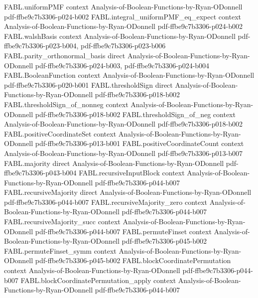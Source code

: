 \begin{theorem}
  {FABL.uniformPMF}
  {context}
  {Analysis-of-Boolean-Functions-by-Ryan-ODonnell}
  {pdf-ffbe9c7b3306-p024-b002}
\proofstep
  {FABL.integral_uniformPMF_eq_expect}
  {context}
  {Analysis-of-Boolean-Functions-by-Ryan-ODonnell}
  {pdf-ffbe9c7b3306-p024-b002}
\proofstep
  {FABL.walshBasis}
  {context}
  {Analysis-of-Boolean-Functions-by-Ryan-ODonnell}
  {pdf-ffbe9c7b3306-p023-b004,
    pdf-ffbe9c7b3306-p023-b006}
\proofstep
  {FABL.parity_orthonormal_basis}
  {direct}
  {Analysis-of-Boolean-Functions-by-Ryan-ODonnell}
  {pdf-ffbe9c7b3306-p024-b003,
    pdf-ffbe9c7b3306-p024-b004}
\proofstep
  {FABL.BooleanFunction}
  {context}
  {Analysis-of-Boolean-Functions-by-Ryan-ODonnell}
  {pdf-ffbe9c7b3306-p020-b001}
\proofstep
  {FABL.thresholdSign}
  {direct}
  {Analysis-of-Boolean-Functions-by-Ryan-ODonnell}
  {pdf-ffbe9c7b3306-p018-b002}
\proofstep
  {FABL.thresholdSign_of_nonneg}
  {context}
  {Analysis-of-Boolean-Functions-by-Ryan-ODonnell}
  {pdf-ffbe9c7b3306-p018-b002}
\proofstep
  {FABL.thresholdSign_of_neg}
  {context}
  {Analysis-of-Boolean-Functions-by-Ryan-ODonnell}
  {pdf-ffbe9c7b3306-p018-b002}
\proofstep
  {FABL.positiveCoordinateSet}
  {context}
  {Analysis-of-Boolean-Functions-by-Ryan-ODonnell}
  {pdf-ffbe9c7b3306-p013-b001}
\proofstep
  {FABL.positiveCoordinateCount}
  {context}
  {Analysis-of-Boolean-Functions-by-Ryan-ODonnell}
  {pdf-ffbe9c7b3306-p013-b007}
\proofstep
  {FABL.majority}
  {direct}
  {Analysis-of-Boolean-Functions-by-Ryan-ODonnell}
  {pdf-ffbe9c7b3306-p043-b004}
\proofstep
  {FABL.recursiveInputBlock}
  {context}
  {Analysis-of-Boolean-Functions-by-Ryan-ODonnell}
  {pdf-ffbe9c7b3306-p044-b007}
\proofstep
  {FABL.recursiveMajority}
  {direct}
  {Analysis-of-Boolean-Functions-by-Ryan-ODonnell}
  {pdf-ffbe9c7b3306-p044-b007}
\proofstep
  {FABL.recursiveMajority_zero}
  {context}
  {Analysis-of-Boolean-Functions-by-Ryan-ODonnell}
  {pdf-ffbe9c7b3306-p044-b007}
\proofstep
  {FABL.recursiveMajority_succ}
  {context}
  {Analysis-of-Boolean-Functions-by-Ryan-ODonnell}
  {pdf-ffbe9c7b3306-p044-b007}
\proofstep
  {FABL.permuteFinset}
  {context}
  {Analysis-of-Boolean-Functions-by-Ryan-ODonnell}
  {pdf-ffbe9c7b3306-p045-b002}
\proofstep
  {FABL.permuteFinset_symm}
  {context}
  {Analysis-of-Boolean-Functions-by-Ryan-ODonnell}
  {pdf-ffbe9c7b3306-p045-b002}
\proofstep
  {FABL.blockCoordinatePermutation}
  {context}
  {Analysis-of-Boolean-Functions-by-Ryan-ODonnell}
  {pdf-ffbe9c7b3306-p044-b007}
\proofstep
  {FABL.blockCoordinatePermutation_apply}
  {context}
  {Analysis-of-Boolean-Functions-by-Ryan-ODonnell}
  {pdf-ffbe9c7b3306-p044-b007}
\proofstep

\end{theorem}
